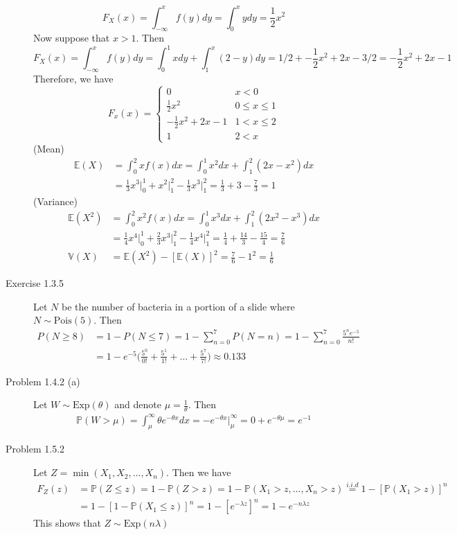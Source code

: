 \documentclass[12pt]{article}  %
\newcommand{\E}{{\mathbb{E}}}
\newcommand{\V}{{\mathbb{V}}}
\newcommand{\prob}{{\mathbb{P}}}
\begin{document}
\begin{description}
$$F_X(x) = \int_{-\infty}^{x}f(y)dy =  \int_0^x ydy = \frac{1}{2}x^2$$ Now suppose that $x>1$. Then 
$$F_X(x) = \int_{-\infty}^{x}f(y)dy =  \int_0^1 xdy  + \int_{1}^x(2-y)dy = 1/2 + -\frac{1}{2}x^2+2x -3/2 = -\frac{1}{2}x^2 + 2x -1$$ Therefore, we have \[F_x(x) = \begin{cases} 
    0 & x< 0 \\
    \frac{1}{2}x^2 & 0\leq x \leq 1\\
	-\frac{1}{2}x^2 + 2x -1 & 1< x \leq 2\\
	1 & 2<x
   \end{cases}
\] 
(Mean) 
\begin{align*}
\E(X) &= \int_0^2xf(x)dx = \int_0^1x^2dx + \int_1^2 (2x - x^2)dx\\
&= \frac{1}{3}x^3\Big\vert_0^1 + x^2\Big\vert_1^2 - \frac{1}{3}x^3\Big\vert_1^2 = \frac{1}{3} + 3 - \frac{7}{3} = 1  
\end{align*}
(Variance)\begin{align*}
\E(X^2) &= \int_0^2x^2f(x)dx = \int_0^1x^3dx + \int_1^2 (2x^2 - x^3)dx\\
&= \frac{1}{4}x^4\Big\vert_0^1 + \frac{2}{3}x^3\Big\vert_1^2 - \frac{1}{4}x^4\Big\vert_1^2 = \frac{1}{4} + \frac{14}{3} - \frac{15}{4} = \frac{7}{6}\\
\V(X) & = \E(X^2) - [\E(X)]^2 = \frac{7}{6} - 1^2 = \frac{1}{6}  
\end{align*}
\item[Exercise 1.3.5] Let $N$ be the number of bacteria in a portion of a slide where $N\sim\text{Pois}(5)$. Then \begin{align*}P(N\geq 8) &= 1 - P(N\leq 7) = 1 - \sum_{n = 0}^{7}P(N = n) = 1 - \sum_{n = 0}^{7}\frac{5^ne^{-5}}{n!}\\
&= 1 - e^{-5}\Big(\frac{5^0}{0!} + \frac{5^1}{1!} +\ldots +\frac{5^7}{7!}\Big) \approx 0.133
\end{align*}
\item[Problem 1.4.2 (a)] Let $W\sim\text{Exp}(\theta)$ and denote $\mu = \frac{1}{\theta}$. Then 
\begin{align*}
\prob(W>\mu) = \int_{\mu}^{\infty} \theta e^{-\theta x}dx = -e^{-\theta x}\Big\vert_{\mu}^{\infty} = 0 + e^{-\theta\mu} = e^{-1}
\end{align*}
\item[Problem 1.5.2] Let $Z = \min(X_1, X_2, \ldots, X_n)$. Then we have 
\begin{align*}
F_Z(z) &= \prob(Z\leq z) = 1- \prob(Z>z) = 1 - \prob(X_1>z, \ldots, X_n>z) \overset{i.i.d}{=} 1 -[\prob(X_1>z)]^n\\
&= 1 - [1 - \prob(X_1\leq z)]^n = 1 - [e^{-\lambda z}]^n = 1 - e^{-n\lambda z}
\end{align*} This shows that $Z\sim\text{Exp}(n\lambda)$


\end{description}
\end{document}
